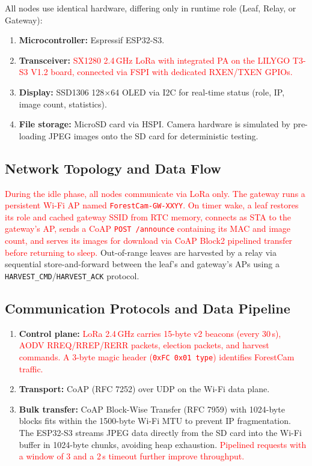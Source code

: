 \documentclass[12pt,a4paper]{article}
\newcommand{\changed}[1]{\textcolor{red}{#1}}
\begin{document}
All nodes use identical hardware, differing only in runtime role (Leaf, Relay, or Gateway):

\begin{enumerate}
    \item \textbf{Microcontroller:} Espressif ESP32-S3.
    \item \textbf{Transceiver:} \changed{SX1280 2.4\,GHz LoRa with integrated PA on the LILYGO T3-S3 V1.2 board, connected via FSPI with dedicated RXEN/TXEN GPIOs.}
    \item \textbf{Display:} SSD1306 128$\times$64 OLED via I2C for real-time status (role, IP, image count, statistics).
    \item \textbf{File storage:} MicroSD card via HSPI. Camera hardware is simulated by pre-loading JPEG images onto the SD card for deterministic testing.
\end{enumerate}

\subsection{Network Topology and Data Flow}

\changed{During the idle phase, all nodes communicate via LoRa only. The gateway runs a persistent Wi-Fi AP named \texttt{ForestCam-GW-XXYY}. On timer wake, a leaf restores its role and cached gateway SSID from RTC memory, connects as STA to the gateway's AP, sends a CoAP \texttt{POST /announce} containing its MAC and image count, and serves its images for download via CoAP Block2 pipelined transfer before returning to sleep.} Out-of-range leaves are harvested by a relay via sequential store-and-forward between the leaf's and gateway's APs using a \texttt{HARVEST\_CMD}/\texttt{HARVEST\_ACK} protocol.

\subsection{Communication Protocols and Data Pipeline}

\begin{enumerate}
    \item \textbf{Control plane:} \changed{LoRa 2.4\,GHz carries 15-byte v2 beacons (every 30\,s), AODV RREQ/RREP/RERR packets, election packets, and harvest commands. A 3-byte magic header (\texttt{0xFC 0x01 type}) identifies ForestCam traffic.}
    \item \textbf{Transport:} CoAP (RFC 7252) over UDP on the Wi-Fi data plane.
    \item \textbf{Bulk transfer:} CoAP Block-Wise Transfer (RFC 7959) with 1024-byte blocks fits within the 1500-byte Wi-Fi MTU to prevent IP fragmentation. The ESP32-S3 streams JPEG data directly from the SD card into the Wi-Fi buffer in 1024-byte chunks, avoiding heap exhaustion. \changed{Pipelined requests with a window of 3 and a 2\,s timeout further improve throughput.}
\end{enumerate}
\end{document}
